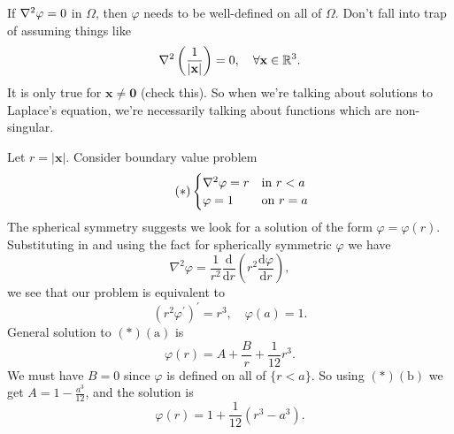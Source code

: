 \begin{remark}
    If $ \laplacian \varphi=0 $ in $ \Omega $, then $ \varphi $ needs to be well-defined on all of $ \Omega $. Don't fall into trap of assuming things like
    \[
        \laplacian\left( \frac{1}{|\mathbf{x}|} \right)=0,\quad \forall \mathbf{x}\in \mathbb{R}^{3}.
    \]
    It is only true for $\mathbf{x}\neq \mathbf{0}$ (check this). So when we’re talking about solutions to Laplace’s equation, we’re necessarily talking about functions which are non-singular. 
\end{remark}

\begin{example}
    Let $ r=|\mathbf{x}| $. Consider boundary value problem 
    \[\tag{$*$}
        \begin{cases}
        \laplacian \varphi=r &\text{in }r<a\\
        \varphi=1 &\text{on }r=a\\
        \end{cases} 
    \]
    The spherical symmetry suggests we look for a solution of the form $ \varphi=\varphi(r) $. Substituting in and using the fact for spherically symmetric $ \varphi $ we have 
    \[
        \nabla^{2} \varphi=\frac{1}{r^{2}} \frac{\mathrm{d}}{\mathrm{d} r}\left(r^{2} \frac{\mathrm{d} \varphi}{\mathrm{d} r}\right),
    \]
    we see that our problem is equivalent to
    \[
        \left(r^{2} \varphi^{\prime}\right)^{\prime}=r^{3}, \quad \varphi(a)=1.
    \]
    General solution to $(*)(\mathrm{a})$ is 
    \[
        \varphi(r)=A+\frac{B}{r}+\frac{1}{12}r^3.
    \]
    We must have $B=0$ since $ \varphi $ is defined on all of $ \{r<a\} $. So using $ (*)(\mathrm{b}) $ we get $ A=1-\frac{a^3}{12} $, and the solution is 
    \[
        \varphi(r) = 1+\frac{1}{12}(r^3-a^3).
    \]
\end{example}

